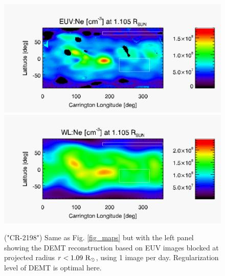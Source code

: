 \documentclass[baaa]{baaa}
\begin{document}
\clearpage

\begin{figure}[]
  \centering
  \includegraphics[width=\columnwidth]{map_Ne_CR2198_DEMT-AIA_H1-L799_r3D_reduced_1105_Rsun.pdf}
  \includegraphics[width=\columnwidth]{map_x_KCORCR219813imgs-reducedbf2ri105ro225_Inst_109_200_120_90_180_dropneg_r3D_l1e-4_1105_Rsun.pdf}
  \caption{("CR-2198") Same as Fig. \ref{fig_maps} but with the left panel showing the DEMT reconstruction based on EUV images blocked at projected radius $r<1.09~\rm{R}_\odot$, using 1 image per day. Regularization level of DEMT is optimal here.}
  \label{fig_maps6}
\end{figure}
\end{document}
